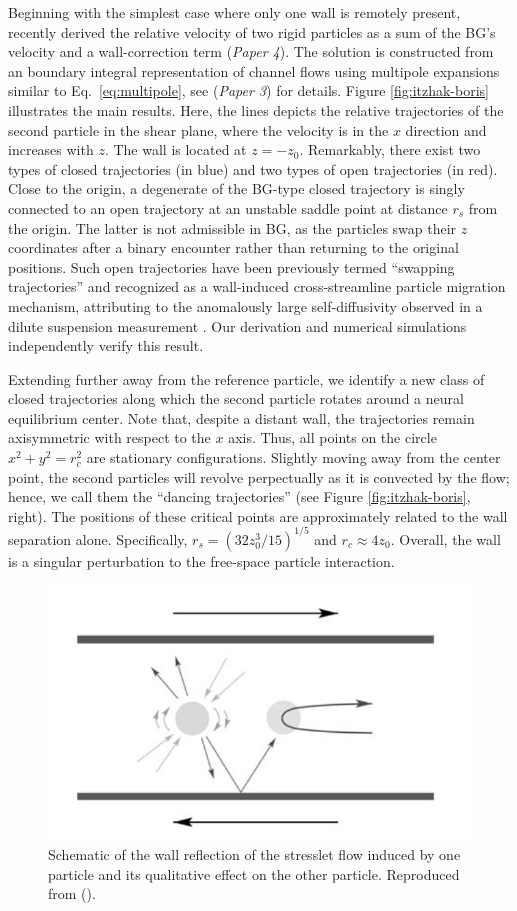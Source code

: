 Beginning with the simplest case where only one wall is remotely present, \cite{Fouxon_Rubinstein2019} recently derived the relative velocity of two rigid particles as a sum of the BG's velocity and a wall-correction term (\emph{Paper 4}). The solution is constructed from an boundary integral representation of channel flows using multipole expansions similar to Eq.\ \eqref{eq:multipole}, see \cite{Fouxon_2017} (\emph{Paper 3}) for details.
Figure \ref{fig:itzhak-boris} illustrates the main results.
Here, the lines depicts the relative trajectories of the second particle in the shear plane, where the velocity is in the $x$ direction and increases with $z$. The wall is located at $z=-z_0$.
Remarkably, there exist two types of closed trajectories (in blue) and two types of open trajectories (in red).
Close to the origin, a degenerate of the BG-type closed trajectory is singly connected to an open trajectory at an unstable saddle point at distance $r_s$ from the origin.
The latter is not admissible in BG, as the particles swap their $z$ coordinates after a binary encounter rather than returning to the original positions.
Such open trajectories have been previously termed ``swapping trajectories'' and recognized as a wall-induced cross-streamline particle migration mechanism, attributing to the anomalously large self-diffusivity observed in a dilute suspension measurement \citep{Zarraga_Leighton2002, zurita-gotor_2007}.
Our derivation and numerical simulations independently verify this result.

Extending further away from the reference particle, we identify a new class of closed trajectories along which the second particle rotates around a neural equilibrium center. Note that, despite a distant wall, the trajectories remain axisymmetric with respect to the $x$ axis. Thus, all points on the circle $x^2+y^2=r_c^2$ are stationary configurations.
Slightly moving away from the center point, the second particles will revolve perpectually as it is convected by the flow; hence, we call them the ``dancing trajectories'' (see Figure \ref{fig:itzhak-boris}, right).
The positions of these critical points are approximately related to the wall separation alone. Specifically, $r_s=(32z_0^3/15)^{1/5}$ and $r_c \approx 4z_0$.
Overall, the wall is a singular perturbation to the free-space particle interaction.

\begin{figure}%
  \centering
  \includegraphics[width=0.55\columnwidth]{stresslet_reflection.png}
  \caption{Schematic of the wall reflection of the stresslet flow induced by one particle and its qualitative effect on the other particle. Reproduced from \cite{zurita-gotor_2007} ().}
  \label{fig:stresslet-refl}
\end{figure}

